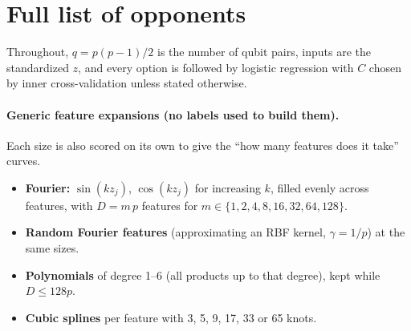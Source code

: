 \documentclass[11pt]{article}
\begin{document}
\appendix
\section{Full list of opponents}\label{app:opponents}

Throughout, $q=p(p-1)/2$ is the number of qubit pairs, inputs are the standardized $z$, and every option is
followed by logistic regression with $C$ chosen by inner cross-validation unless stated otherwise.

\paragraph{Generic feature expansions (no labels used to build them).} Each size is also scored on its own
to give the ``how many features does it take'' curves.
\begin{itemize}\setlength{\itemsep}{1pt}
\item \textbf{Fourier:} $\sin(kz_j)$, $\cos(kz_j)$ for increasing $k$, filled evenly across features, with
$D=m\,p$ features for $m\in\{1,2,4,8,16,32,64,128\}$.
\item \textbf{Random Fourier features} (approximating an RBF kernel, $\gamma=1/p$) at the same sizes.
\item \textbf{Polynomials} of degree 1--6 (all products up to that degree), kept while $D\le128p$.
\item \textbf{Cubic splines} per feature with 3, 5, 9, 17, 33 or 65 knots.
\end{itemize}
\end{document}
